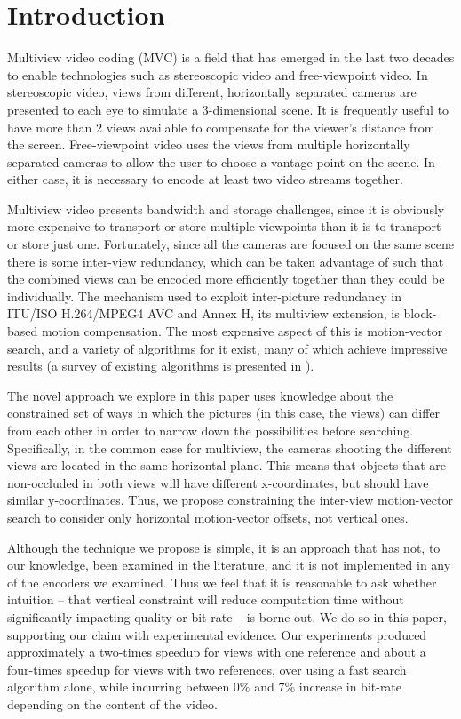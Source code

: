 \documentclass{sig-alternate-05-2015}
\begin{document}

\section{Introduction} %
\label{sec:introduction} %
Multiview video coding (MVC) is a field that has emerged in the last two decades
to enable technologies such as stereoscopic video and free-viewpoint video. In
stereoscopic video, views from different, horizontally separated cameras are
presented to each eye to simulate a 3-dimensional scene. It is frequently useful
to have more than 2 views available to compensate for the viewer's distance from
the screen. Free-viewpoint video uses the views from multiple horizontally
separated cameras to allow the user to choose a vantage point on the scene. In
either case, it is necessary to encode at least two video streams together.

Multiview video presents bandwidth and storage challenges, since it is obviously
more expensive to transport or store multiple viewpoints than it is to transport
or store just one. Fortunately, since all the cameras are focused on the same
scene there is some inter-view redundancy, which can be taken advantage of such
that the combined views can be encoded more efficiently together than they could
be individually. The mechanism used to exploit inter-picture redundancy in
ITU/ISO H.264/MPEG4 AVC and Annex H, its multiview extension, is block-based
motion compensation. The most expensive aspect of this is motion-vector search,
and a variety of algorithms for it exist, many of which achieve impressive
results (a survey of existing algorithms is presented in \cite{khattak:fast}).

The novel approach we explore in this paper uses knowledge about the constrained
set of ways in which the pictures (in this case, the views) can differ from each
other in order to narrow down the possibilities before searching. Specifically,
in the common case for multiview, the cameras shooting the different views are
located in the same horizontal plane. This means that objects that are
non-occluded in both views will have different x-coordinates, but should
have similar y-coordinates. Thus, we propose constraining the inter-view
motion-vector search to consider only horizontal motion-vector offsets, not
vertical ones.

Although the technique we propose is simple, it is an approach that has not, to
our knowledge, been examined in the literature, and it is not implemented in any
of the encoders we examined. Thus we feel that it is reasonable to ask whether
intuition -- that vertical constraint will reduce computation time without
significantly impacting quality or bit-rate -- is borne out. We do so in this
paper, supporting our claim with experimental evidence. Our experiments produced
approximately a two-times speedup for views with one reference and about a
four-times speedup for views with two references, over using a fast search
algorithm alone, while incurring between $0\%$ and $7\%$ increase in bit-rate
depending on the content of the video.
\end{document}
